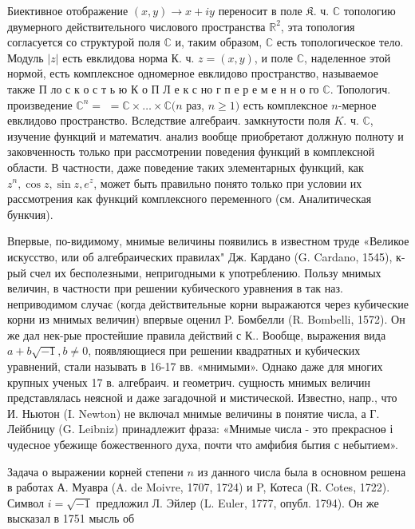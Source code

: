 \documentclass[10pt]{article}
\begin{document}
Биективное отображение $(x, y) \rightarrow x+i y$ переносит в поле $\mathfrak{K}$. ч. $\mathbb{C}$ топологию двумерного действительного числового пространства $\mathbb{R}^{2}$, эта топология согласуется со структурой поля $\mathbb{C}$ и, таким образом, $\mathbb{C}$ есть топологическое тело. Модуль $|z|$ есть евклидова норма К. ч. $z=(x, y)$, и поле $\mathbb{C}$, наделенное этой нормой, есть комплексное одномерное евклидово пространство, называемое также П ло с к о с т ь ю К о П Л е к с но г п е р е м е н н о го $\mathbb{C}$. Топологич. произведение $\mathbb{C}^{n}=$ $=\mathbb{C} \times \ldots \times \mathbb{C}(n$ раз, $n \geqslant 1)$ есть комплексное $n$-мерное евклидово пространство. Вследствие алгебраич. замкнутости поля $K$. ч. $\mathbb{C}$, изучение функций и математич. анализ вообще приобретают должную полноту и заковченность только при рассмотрении поведения функций в комплексной области. В частности, даже поведение таких элементарных функций, как $z^{n}, \cos z, \sin z, e^{z}$, может быть правильно понято только при условии их рассмотрения как функций комплексного переменного (см. Аналитическая бункчия).



Впервые, по-видимому, мнимые величины появились в известном труде «Великое искусство, или об алгебраических правилах" Дж. Кардано (G. Cardano, 1545), к-рый счел их бесполезными, непригодными к употреблению. Пользу мнимых величин, в частности при решении кубического уравнения в так наз. неприводимом случає (когда действительные корни выражаются через кубические корни из мнимых величин) впервые оценил P. Бомбелли (R. Bombelli, 1572). Он же дал нек-рые простейшие правила действий с К.. Вообще, выражения вида $a+b \sqrt{-1}, b \neq 0$, появляющиеся при решении квадратных и кубических уравнений, стали называть в 16-17 вв. «мнимыми». Однако даже для многих крупных ученых 17 в. алгебраич. и геометрич. сущность мнимых величин представлялась неясной и даже загадочной и мистической. Известно, напр., что И. Ньютон (I. Newton) не включал мнимые величины в понятие числа, а Г. Лейбницу (G. Leibniz) принадлежит фраза: «Мнимые числа - это прекрасноө і чудесное убежище божественного духа, почти что амфибия бытия с небытием».



Задача о выражении корней степени $n$ из данного числа была в основном решена в работах А. Муавра (A. de Moivre, 1707, 1724) и P, Котеса (R. Cotes, 1722). Символ $i=\sqrt{-1}$ предложил Л. Эйлер (L. Euler, 1777, опубл. 1794). Он же высказал в 1751 мысль об
\end{document}
